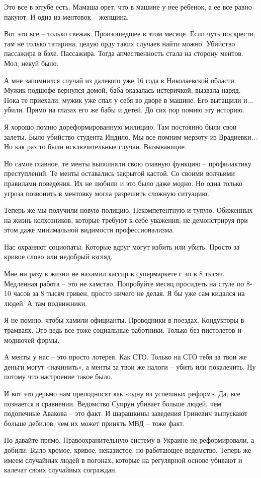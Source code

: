 Это все в ютубе есть. Мамаша орет, что в машине у нее ребенок, а ее все равно
пакуют. И одна из ментовок – женщина.

Вот это все – только свежак. Произошедшее в этом месяце. Если чуть поскрести,
там не только татарина, целую орду таких случаев найти можно. Убийство
пассажира в бэхе. Пассажира. Тогда апчественность стала на сторону ментов. Мол,
некуй было.

А мне запомнился случай из далекого уже 16 года в Николаевской области. Мужик
подшофе вернулся домой, баба оказалась истеричкой, вызвала наряд. Пока те
приехали, мужик уже спал у себя во дворе в машине. Его вытащили и... убили.
Прямо на глазах его же бабы и детей. До сих пор помню эту историю.

Я хорошо помню дореформированную милицию. Там постоянно были свои залеты. Было
убийство студента Индило. Мы все помним мерзоту из Врадиевки... Но как раз то
были исключительные случаи. Вызывающие.

Но самое главное, те менты выполняли свою главную функцию – профилактику
преступлений. Те менты оставались закрытой кастой. Со своими волчьими правилами
поведения. Их не любили и это было даже модно. Но одна только угроза позвонить
в ментовку могла разрешить сложную ситуацию.

Теперь же мы получили новую полицию. Некомпетентную и тупую. Обиженных на жизнь
колхозников, которые требуют к себе уважения, не демонстрируя при этом даже
минимальной видимости профессионализма.

Нас охраняют социопаты. Которые вдруг могут избить или убить. Просто за кривое
слово или недобрый взгляд.

Мне ни разу в жизни не нахамил кассир в супермаркете с зп в 8 тысяч. Медленная
работа – это не хамство. Попробуйте месяц просидеть на стуле по 8-10 часов за 8
тысяч гривен, просто ничего не делая. Я бы уже сам кидался на людей. А там
подвижники.

Я не помню, чтобы хамили официанты. Проводники в поездах. Кондукторы в
трамваях. Это ведь все тоже социальные работники. Только без пистолетов и
моднючей формы.

А менты у нас – это просто лотерея. Как СТО. Только на СТО тебя за твои же
деньги могут «начинить», а менты за твои же налоги – убить или покалечить. Ну
потому что настроение такое было.

И вот это дерьмо нам преподносят как «одну из успешных реформ». Да, все
познается в сравнении. Ведомство Супрун убивает больше людей, чем подопечные
Авакова – это факт. И шарашкины заведения Гриневич выпускают больше дебилов,
чем их может принять МВД – тоже факт.

Но давайте прямо. Правоохранительную систему в Украине не реформировали, а
добили. Было хромое, кривое, неказистое, но работающее ведомство. Теперь же
имеем случайных людей в погонах, которые на регулярной основе убивают и калечат
своих случайных сограждан.

